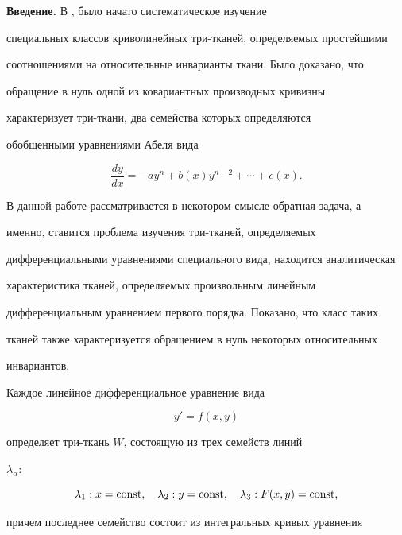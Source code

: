 \label{begin} 


 


 


{\bf Введение.} В \cite{1}, \cite{2} было начато систематическое изучение 


специальных классов криволинейных три-тканей, определяемых простейшими 


соотношениями на относительные инварианты ткани. Было доказано, что 


обращение в нуль одной из ковариантных производных кривизны 


характеризует три-ткани, два семейства которых определяются 


обобщенными уравнениями Абеля вида 


$$ 


\frac{dy}{dx}=-a y^n+b(x)y^{n-2}+\dotsb+c(x). 


$$ 


В данной работе рассматривается в некотором смысле обратная задача, а 


именно, ставится проблема изучения три-тканей, определяемых 


дифференциальными уравнениями специального вида, находится аналитическая 


характеристика тканей, определяемых произвольным линейным 


дифференциальным уравнением первого порядка. Показано, что класс таких 


тканей также характеризуется обращением в нуль некоторых относительных 


инвариантов. 


 


Каждое линейное дифференциальное уравнение вида 


\begin{equation} 


y'=f(x,y) 


\end{equation} 


определяет три-ткань $W$, состоящую из трех семейств линий 


$\lambda_\alpha$:


$$ 


\lambda_1:x=\const,\quad \lambda_2:y=\const,\quad 


\lambda_3:F(x,y)=\const, 


$$ 


причем последнее семейство состоит из интегральных кривых уравнения 


